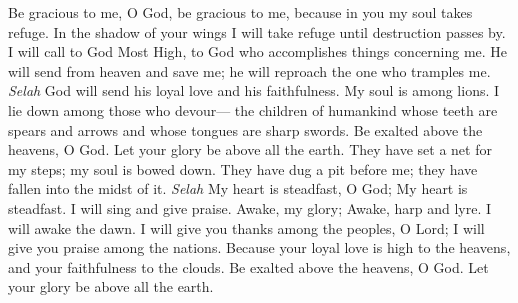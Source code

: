 \begin{biblechapter} %
 Be gracious to me, O God, be gracious to me, 
because in you my soul takes refuge. 
In the shadow of your wings I will take refuge 
until destruction passes by.
\verse I will call to God Most High, 
to God who accomplishes things concerning me.
\verse He will send from heaven and save me; 
he will reproach the one who tramples me. \textit{Selah} 
God will send his loyal love and his faithfulness.
\verse My soul is among lions. 
I lie down among those who devour— 
the children of humankind whose teeth are spears and arrows 
and whose tongues are sharp swords.
\verse Be exalted above the heavens, O God. 
Let your glory be above all the earth.
\verse They have set a net for my steps; 
my soul is bowed down. 
They have dug a pit before me; 
they have fallen into the midst of it. \textit{Selah}
\verse My heart is steadfast, O God; 
My heart is steadfast. 
I will sing and give praise.
\verse Awake, my glory; 
Awake, harp and lyre. 
I will awake the dawn.
\verse I will give you thanks among the peoples, O Lord; 
I will give you praise among the nations.
\verse Because your loyal love is high to the heavens, 
and your faithfulness to the clouds.
\verse Be exalted above the heavens, O God. 
Let your glory be above all the earth.
\end{biblechapter}

